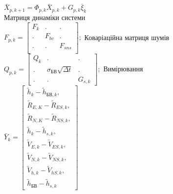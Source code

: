 \documentclass[ucs,compress]{beamer}    %
\begin{document}
\begin{frame}[shrink=5]
\begin{columns}[t]
\begin{column}{5cm}
$\bar{X}_{p,k+1} =\Phi_{p,k} \bar{X}_{p,k} +G_{p,k} \bar{\xi }_{k}$ \\
Матриця динаміки системи\\
$ F_{p,k} =\left[\begin{array}{ccc} 
{F_{k} } & {.} & {.} \\
{.} & {F_{bv}} & {.} \\
{.} & {.} & {F_{sns}} \\
\end{array}\right];$
Коваріаційна матриця шумів\\
$Q_{p,k} =\left[\begin{array}{ccc} 
{Q_{k} } & {.} & {.} \\ 
{.} & {\sigma_{\text{БВ}} \sqrt{\Delta t}} & {.} \\ 
{.} & {.} & {G_{s,k} } \end{array}\right];$
Вимірювання\\
$\bar{Y}_{k} = 
\left[\begin{array}{l}
{\tilde{h}_{k} -\tilde{h}_{\text{БВ},k},}\\
{\tilde{R}_{E,K} -\tilde{R}_{ES,k},}\\
{\tilde{R}_{N,K} -\tilde{R}_{NS,k},}\\
{\tilde{h}_{k} -\tilde{h}_{s,k},}\\
{\tilde{V}_{E,k} -\tilde{V}_{ES,k},}\\
{\tilde{V}_{N,k} -\tilde{V}_{NS,k},}\\
{\tilde{V}_{h,k} -\tilde{V}_{hS,k},}\\
{\tilde{h}_{\text{БВ}} -\tilde{h}_{s,k}}
\end{array} \right] $
\end{column}
\end{columns}
\end{frame}


\end{document}
